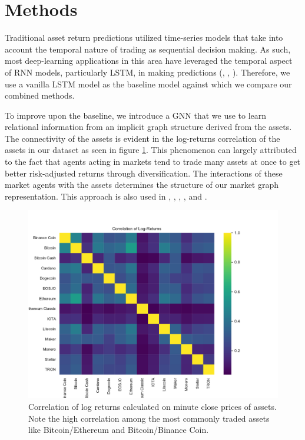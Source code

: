 \section{Methods} \label{Methods}

Traditional asset return predictions utilized time-series models that take into account the temporal nature of trading as sequential decision making. As such, most deep-learning applications in this area have leveraged the temporal aspect of RNN models, particularly LSTM, in making predictions (\cite{Shen2020}, \cite{Li2018}, \cite{Selvin2017}). Therefore, we use a vanilla LSTM model as the baseline model against which we compare our combined methods.

To improve upon the baseline, we introduce a GNN that we use to learn relational information from an implicit graph structure derived from the assets. The connectivity of the assets is evident in the log-returns correlation of the assets in our dataset as seen in figure \ref{fig:asset_corr}. This phenomenon can largely attributed to the fact that agents acting in markets tend to trade many assets at once to get better risk-adjusted returns through diversification. The interactions of these market agents with the assets determines the structure of our market graph representation. This approach is also used in \cite{Matsunaga2019}, \cite{Feng2019}, \cite{Sun2020}, \cite{Hou2021}, and \cite{Peng2021}.

\begin{figure}[H]
	\centering
	\includegraphics[width=\linewidth]{../../figures/correlation.pdf}
	\caption{Correlation of log returns calculated on minute close prices of assets. Note the high correlation among the most commonly traded assets like Bitcoin/Ethereum and Bitcoin/Binance Coin.}
	\label{fig:asset_corr}
\end{figure}


